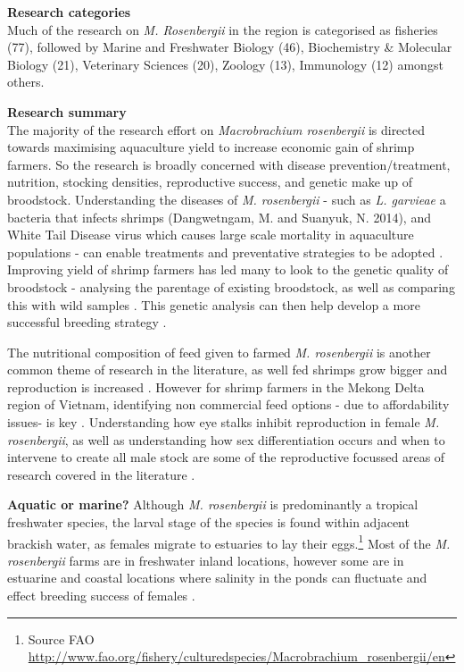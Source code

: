 \documentclass[openany]{book}
\let\rmarkdownfootnote\footnote%
\def\footnote{\protect\rmarkdownfootnote}
\theoremstyle{definition}
\theoremstyle{definition}
\theoremstyle{definition}
\theoremstyle{remark}
\begin{document}
\textbf{Research categories}\\
Much of the research on \emph{M. Rosenbergii} in the region is
categorised as fisheries (77), followed by Marine and Freshwater Biology
(46), Biochemistry \& Molecular Biology (21), Veterinary Sciences (20),
Zoology (13), Immunology (12) amongst others.

\textbf{Research summary}\\
The majority of the research effort on \emph{Macrobrachium rosenbergii}
is directed towards maximising aquaculture yield to increase economic
gain of shrimp farmers. So the research is broadly concerned with
disease prevention/treatment, nutrition, stocking densities,
reproductive success, and genetic make up of broodstock. Understanding
the diseases of \emph{M. rosenbergii} - such as \emph{L. garvieae} a
bacteria that infects shrimps (Dangwetngam, M. and Suanyuk, N. 2014),
and White Tail Disease virus which causes large scale mortality in
aquaculture populations - can enable treatments and preventative
strategies to be adopted \citep{Bonami_2011}. Improving yield of shrimp
farmers has led many to look to the genetic quality of broodstock -
analysing the parentage of existing broodstock, as well as comparing
this with wild samples \citep{Karaket_2012, Nguyen_Thanh_2015}. This
genetic analysis can then help develop a more successful breeding
strategy \citep{Thanh_2010}.

The nutritional composition of feed given to farmed \emph{M.
rosenbergii} is another common theme of research in the literature, as
well fed shrimps grow bigger and reproduction is increased
\citep{Kangpanich_2016}. However for shrimp farmers in the Mekong Delta
region of Vietnam, identifying non commercial feed options - due to
affordability issues- is key \citep{Hien_2005}. Understanding how eye
stalks inhibit reproduction in female \emph{M. rosenbergii}, as well as
understanding how sex differentiation occurs and when to intervene to
create all male stock are some of the reproductive focussed areas of
research covered in the literature
\citep{Sripiromrak_2014, Jung_2016, Rungsin_2012}.

\textbf{Aquatic or marine?} Although \emph{M. rosenbergii} is
predominantly a tropical freshwater species, the larval stage of the
species is found within adjacent brackish water, as females migrate to
estuaries to lay their eggs.\footnote{Source FAO
  \url{http://www.fao.org/fishery/culturedspecies/Macrobrachium_rosenbergii/en}}
Most of the \emph{M. rosenbergii} farms are in freshwater inland
locations, however some are in estuarine and coastal locations where
salinity in the ponds can fluctuate and effect breeding success of
females \citep{Yen_2008}.
\end{document}
